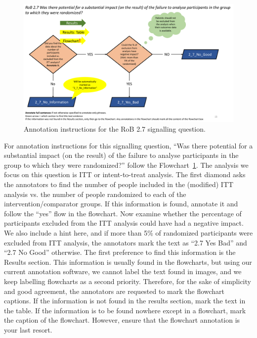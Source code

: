\documentclass[sn-mathphys,Numbered]{sn-jnl}%
\begin{document}
%
%
%
\begin{figure}[hbt]
    \centering
    \includegraphics[width=\textwidth]{figures/2_7.pdf}
    \caption{Annotation instructions for the RoB 2.7 signalling question.}
    \label{fig:2_7}
\end{figure}
%
%
%


For annotation instructions for this signalling question, ``Was there potential for a substantial impact (on the result) of the failure to analyse participants in the group to which they were randomized?'' follow the Flowchart~\ref{fig:2_7}.
The analysis we focus on this question is ITT or intent-to-treat analysis.
The first diamond asks the annotators to find the number of people included in the (modified) ITT analysis vs. the number of people randomized to each of the intervention/comparator groups. 
If this information is found, annotate it and follow the ``yes'' flow in the flowchart.
Now examine whether the percentage of participants excluded from the ITT analysis could have had a negative impact.
We also include a hint here, and if more than 5\% of randomized participants were excluded from ITT analysis, the annotators mark the text as ``2.7 Yes Bad'' and ``2.7 No Good'' otherwise.
The first preference to find this information is the Results section.
This information is usually found in the flowcharts, but using our current annotation software, we cannot label the text found in images, and we keep labelling flowcharts as a second priority. 
Therefore, for the sake of simplicity and good agreement, the annotators are requested to mark the flowchart captions.
If the information is not found in the results section, mark the text in the table.
If the information is to be found nowhere except in a flowchart, mark the caption of the flowchart.
However, ensure that the flowchart annotation is your last resort.
\end{document}
